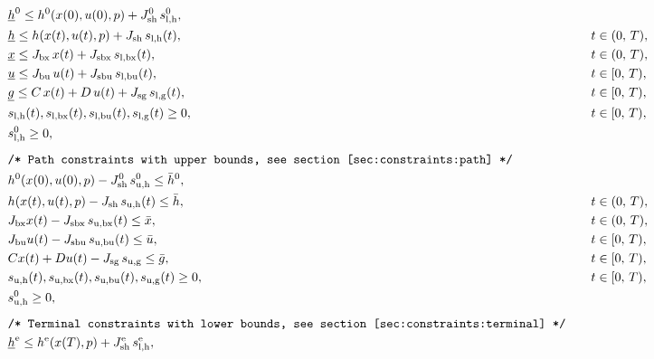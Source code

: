 \documentclass[english]{article}
\newcommand{\ind}[1]{_{\textrm{#1}}}
\newcommand{\terminal}{^{\textrm{e}}}
\newcommand{\initial}{^{\textrm{0}}}
\newcommand{\lowerh}{\ind{l,h}}
\newcommand{\lowerbx}{\ind{l,bx}}
\newcommand{\lowerbu}{\ind{l,bu}}
\newcommand{\lowerg}{\ind{l,g}}
\newcommand{\upperh}{\ind{u,h}}
\newcommand{\upperbx}{\ind{u,bx}}
\newcommand{\upperbu}{\ind{u,bu}}
\newcommand{\upperg}{\ind{u,g}}
\newcommand{\mathComment}[1]{\texttt{/* #1 */}}
\begin{document}
\begin{align}
    &&&\underline{h}\initial \leq h\initial(x(0), u(0), p) + J_{\textrm{sh}}\initial \, s\lowerh\initial, &&\label{eq:constraints:path:lower_bounds:start}\\
    &&&\underline{h} \leq h(x(t), u(t), p) + J_{\textrm{sh}} \, s\lowerh(t), &&\quad t \in (0,\,T),\\
    &&&\underline{x} \leq J_{\textrm{bx}} \, x(t) + J_{\textrm{sbx}} \,s\lowerbx(t), &&\quad t \in (0,\,T),\\
    &&&\underline{u} \leq J_{\textrm{bu}} \,u(t) + J_{\textrm{sbu}} \,s\lowerbu(t), &&\quad t \in [0,\,T),\\
    &&&\underline{g} \leq C\,x(t) + D\,u(t) + J_{\textrm{sg}} \,s\lowerg(t), &&\quad t \in [0,\,T), \\
    &&& s\lowerh (t), s\lowerbx(t), s\lowerbu(t), s\lowerg(t) \geq 0, &&\quad t \in [0,\,T), \\
    &&& s\lowerh\initial \geq 0, && \label{eq:constraints:path:lower_bounds:end}\\[1ex]
    &&&\mathComment{Path constraints with upper bounds, see section \ref{sec:constraints:path}}\nonumber\\
    &&& h\initial(x(0), u(0), p) - J\ind{sh}\initial\, s\ind{u,h}\initial \leq \bar{h}\initial, &&\label{eq:constraints:path:upper_bounds:start}\\
    &&& h(x(t), u(t), p) - J_{\textrm{sh}} \, s\upperh(t) \leq \bar{h}, &&\quad t \in (0,\,T),\\
    &&& J_{\textrm{bx}} x(t) - J_{\textrm{sbx}}\, s\upperbx(t) \leq \bar{x}, &&\quad t \in (0,\,T),\\
    &&& J_{\textrm{bu}} u(t) - J_{\textrm{sbu}}\, s\upperbu(t)\leq \bar{u}, &&\quad t \in [0,\,T),\\
    &&& Cx(t) + Du(t) - J_{\textrm{sg}}\, s\upperg \leq \bar{g}, &&\quad t \in [0,\,T), \\
    &&& s\upperh(t), s\upperbx(t), s\upperbu(t), s\upperg(t) \geq 0, &&\quad t \in [0,\,T), \\
    &&& s\ind{u,h}\initial \geq 0, && \label{eq:constraints:path:upper_bounds:end}\\[1ex]
    &&&\mathComment{Terminal constraints with lower bounds, see section \ref{sec:constraints:terminal}}\nonumber\\
    &&&\underline{h}\terminal \leq h\terminal(x(T), p) + J\ind{sh}\terminal\, s\lowerh\terminal, &&\label{eq:constraints:terminal:lower_bounds:start}\\

\end{align}
\end{document}
